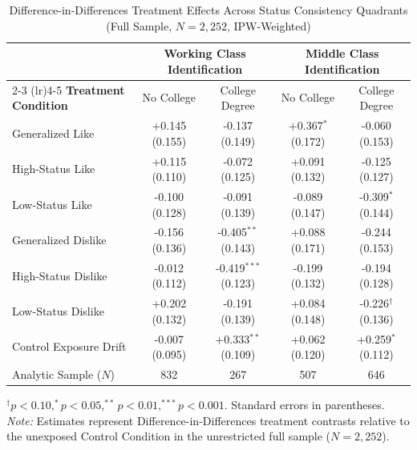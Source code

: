 \begin{table}[ht!]
\centering
\small
\caption{Difference-in-Differences Treatment Effects Across Status Consistency Quadrants (Full Sample, $N = 2{,}252$, IPW-Weighted)}
\label{tbl:did_status_quadrants_full}
\setlength{\tabcolsep}{2.5pt}
\begin{tabular*}{\linewidth}{@{\extracolsep{\fill}}lcccc@{}}
\toprule
& \multicolumn{2}{c}{\textbf{Working Class Identification}} & \multicolumn{2}{c}{\textbf{Middle Class Identification}} \\
\cmidrule(lr){2-3} \cmidrule(lr){4-5}
\textbf{Treatment Condition} & No College & College Degree & No College & College Degree \\
\midrule
Generalized Like & +0.145 (0.155) & -0.137 (0.149) & +0.367$^{*}$ (0.172) & -0.060 (0.153) \\
High-Status Like & +0.115 (0.110) & -0.072 (0.125) & +0.091 (0.132) & -0.125 (0.127) \\
Low-Status Like & -0.100 (0.128) & -0.091 (0.139) & -0.089 (0.147) & -0.309$^{*}$ (0.144) \\
Generalized Dislike & -0.156 (0.136) & -0.405$^{**}$ (0.143) & +0.088 (0.171) & -0.244 (0.153) \\
High-Status Dislike & -0.012 (0.112) & -0.419$^{***}$ (0.123) & -0.199 (0.132) & -0.194 (0.128) \\
Low-Status Dislike & +0.202 (0.132) & -0.191 (0.139) & +0.084 (0.148) & -0.226$^{\dagger}$ (0.136) \\
\midrule
Control Exposure Drift & -0.007 (0.095) & +0.333$^{**}$ (0.109) & +0.062 (0.120) & +0.259$^{*}$ (0.112) \\
Analytic Sample ($N$) & 832 & 267 & 507 & 646 \\
\bottomrule
\end{tabular*}
\begin{minipage}{\linewidth}
\vspace{4pt}
\footnotesize
$^{\dagger}p < 0.10, ^{*}p < 0.05, ^{**}p < 0.01, ^{***}p < 0.001$. Standard errors in parentheses. \newline
\textit{Note:} Estimates represent Difference-in-Differences treatment contrasts relative to the unexposed Control Condition in the unrestricted full sample ($N = 2{,}252$).
\end{minipage}
\end{table}
